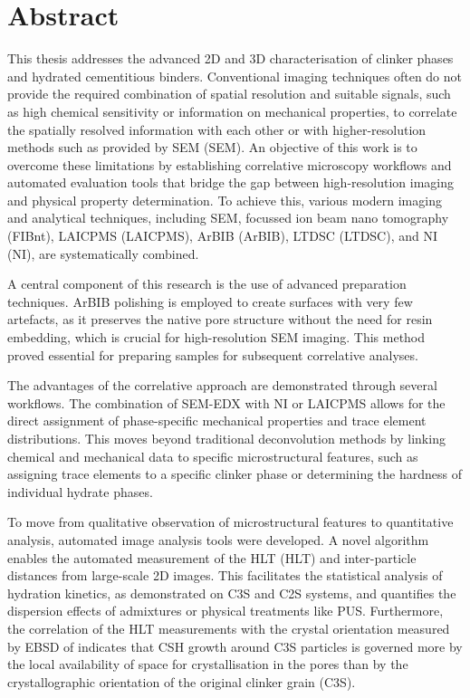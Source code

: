 \chapter*{Abstract}

This thesis addresses the advanced 2D and 3D characterisation of clinker phases and hydrated cementitious binders.
Conventional imaging techniques often do not provide the required combination of spatial resolution and suitable signals, such as high chemical sensitivity or information on mechanical properties, to correlate the spatially resolved information with each other or with higher-resolution methods such as provided by \acl*{SEM} (\acs*{SEM}).
An objective of this work is to overcome these limitations by establishing correlative microscopy workflows and automated evaluation tools that bridge the gap between high-resolution imaging and physical property determination.
To achieve this, various modern imaging and analytical techniques, including \acs*{SEM}, focussed ion beam nano tomography (\acs*{FIBnt}), \acl*{LAICPMS} (\acs*{LAICPMS}), \acl*{ArBIB} (\acs*{ArBIB}), \acl*{LTDSC} (\acs*{LTDSC}), and \acl*{NI} (\acs*{NI}), are systematically combined.

A central component of this research is the use of advanced preparation techniques.
\acs*{ArBIB} polishing is employed to create surfaces with very few artefacts, as it preserves the native pore structure without the need for resin embedding, which is crucial for high-resolution \acs*{SEM} imaging.
This method proved essential for preparing samples for subsequent correlative analyses.

The advantages of the correlative approach are demonstrated through several workflows.
The combination of \acs*{SEM}-\acl*{EDX} with \acs*{NI} or \acs*{LAICPMS} allows for the direct assignment of phase-specific mechanical properties and trace element distributions.
This moves beyond traditional deconvolution methods by linking chemical and mechanical data to specific microstructural features, such as assigning trace elements to a specific clinker phase or determining the hardness of individual hydrate phases.

To move from qualitative observation of microstructural features to quantitative analysis, automated image analysis tools were developed.
A novel algorithm enables the automated measurement of the \acl*{HLT} (\acs*{HLT}) and inter-particle distances from large-scale 2D images.
This facilitates the statistical analysis of hydration kinetics, as demonstrated on \acs*{C3S} and \acs*{C2S} systems, and quantifies the dispersion effects of admixtures or physical treatments like \acl*{PUS}.
Furthermore, the correlation of the \acs*{HLT} measurements with the crystal orientation measured by \acl*{EBSD} of  indicates that \acs*{CSH} growth around \acs*{C3S} particles is governed more by the local availability of space for crystallisation in the pores than by the crystallographic orientation of the original clinker grain (\acs*{C3S}).

